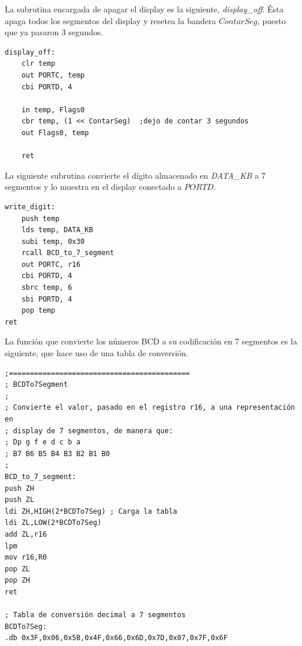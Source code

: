 \documentclass[a4paper, 12pt]{article}
\begin{document}
La subrutina encargada de apagar el display es la siguiente, \textit{display\_off}. Ésta apaga todos los segmentos del display y resetea la bandera $ContarSeg$, puesto que ya pasaron 3 segundos.

\begin{lstlisting}
display_off:
	clr temp
	out PORTC, temp
	cbi PORTD, 4

	in temp, Flags0
	cbr temp, (1 << ContarSeg)	;dejo de contar 3 segundos
	out Flags0, temp

	ret
\end{lstlisting}

La siguiente subrutina convierte el dígito almacenado en \textit{DATA\_KB} a 7 segmentos y lo muestra en el display conectado a $PORTD$.

\begin{lstlisting}
write_digit:
	push temp
	lds temp, DATA_KB
	subi temp, 0x30
	rcall BCD_to_7_segment
	out PORTC, r16
	cbi PORTD, 4
	sbrc temp, 6
	sbi PORTD, 4
	pop temp
ret
\end{lstlisting}

La función que convierte los números BCD a su codificación en 7 segmentos es la siguiente, que hace uso de una tabla de conversión.

\begin{lstlisting}
;===========================================
; BCDTo7Segment
;
; Convierte el valor, pasado en el registro r16, a una representación en 
; display de 7 segmentos, de manera que:
; Dp g f e d c b a
; B7 B6 B5 B4 B3 B2 B1 B0
;
BCD_to_7_segment:
push ZH
push ZL
ldi ZH,HIGH(2*BCDTo7Seg) ; Carga la tabla
ldi ZL,LOW(2*BCDTo7Seg)
add ZL,r16
lpm
mov r16,R0
pop ZL
pop ZH
ret

; Tabla de conversión decimal a 7 segmentos
BCDTo7Seg:
.db 0x3F,0x06,0x5B,0x4F,0x66,0x6D,0x7D,0x07,0x7F,0x6F
\end{lstlisting}


 
\end{document}
